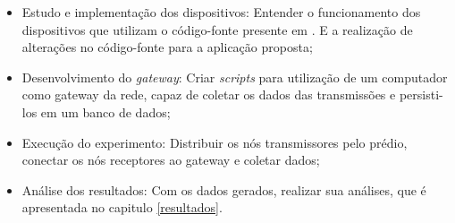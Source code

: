
\begin{itemize}
      \item Estudo e implementação dos dispositivos: Entender o funcionamento dos dispositivos que utilizam o código-fonte presente em \cite{openmoteb-firmware}. E a realização de alterações no código-fonte para a aplicação proposta;
      \item Desenvolvimento do \emph{gateway}: Criar \emph{scripts} para utilização de um computador como gateway da rede, capaz de coletar os dados das transmissões e persisti-los em um banco de dados;
      \item Execução do experimento: Distribuir os nós transmissores pelo prédio, conectar os nós receptores ao gateway e coletar dados;
      \item Análise dos resultados: Com os dados gerados, realizar sua análises, que é apresentada no capitulo \ref{resultados}.
\end{itemize}

